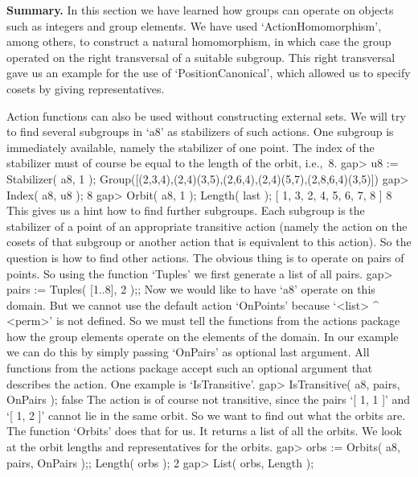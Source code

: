 {\bf Summary.} In this section we have learned  how groups can operate on
{\GAP}   objects such as  integers  and   group  elements.  We  have used
`ActionHomomorphism',    among   others,   to   construct   a  natural
homomorphism,  in which case the  group operated on the right transversal
of a suitable subgroup. This right transversal gave us an example for the
use of `PositionCanonical', which allowed  us to specify cosets by giving
representatives.


Action functions can also be  used without constructing external sets.
We will try to   find several subgroups  in `a8'  as stabilizers of  such
actions. One subgroup is immediately  available, namely the stabilizer
of one point. The index of the stabilizer must of course  be equal to the
length of the orbit, i.e.,~8.
\beginexample
gap> u8 := Stabilizer( a8, 1 );
Group([(2,3,4),(2,4)(3,5),(2,6,4),(2,4)(5,7),(2,8,6,4)(3,5)])
gap> Index( a8, u8 );
8
gap> Orbit( a8, 1 ); Length( last );
[ 1, 3, 2, 4, 5, 6, 7, 8 ]
8
\endexample
This gives us a hint how to find further  subgroups. Each subgroup is the
stabilizer of a point of an appropriate  transitive action (namely the
action  on  the cosets of that  subgroup  or another action that is
equivalent to  this action).  So the question   is how  to find  other
actions. The obvious thing is to operate  on pairs of points. So using
the function `Tuples' we first generate a list of all pairs.
\beginexample
gap> pairs := Tuples( [1..8], 2 );;
\endexample
Now we would like to have `a8' operate on this  domain. But we cannot use
the  default action `OnPoints'  because    `<list> ^ <perm>' is    not
defined. So we  must tell the functions  from the actions package  how
the group elements operate on the elements of  the domain. In our example
we can do this by simply passing `OnPairs' as optional last argument. All
functions  from the actions package  accept  such an optional argument
that describes the action. One example is `IsTransitive'.
\beginexample
gap> IsTransitive( a8, pairs, OnPairs );
false 
\endexample
The action is of course not transitive, since the pairs `[ 1, 1 ]' and
`[ 1, 2 ]' cannot lie in the same orbit.
So we want to  find out what the orbits are.
The function `Orbits' does that for us.
It returns a list of all the orbits.
We look at the orbit lengths and representatives for the orbits.
\beginexample
gap> orbs := Orbits( a8, pairs, OnPairs );; Length( orbs );
2
gap> List( orbs, Length );
